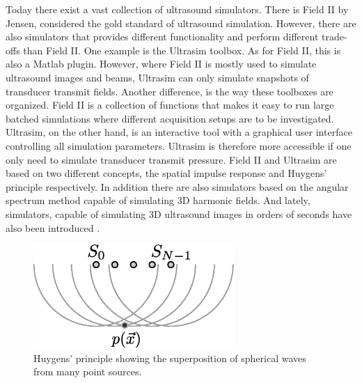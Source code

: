 Today there exist a vast collection of ultrasound simulators. There is Field II by Jensen\cite{Jensen1992}, considered the gold standard of ultrasound simulation. However, there are also simulators that provides different functionality and perform different trade-offs than Field II. One example is the Ultrasim toolbox\cite{Holm2001}. As for Field II, this is also a Matlab plugin. However, where Field II is mostly used to simulate ultrasound images and beams, Ultrasim can only simulate snapshots of transducer transmit fields. Another difference, is the way these toolboxes are organized. Field II is a collection of functions that makes it easy to run large batched simulations where different acquisition setups are to be investigated. Ultrasim, on the other hand, is an interactive tool with a graphical user interface controlling all simulation parameters. Ultrasim is therefore more accessible if one only need to simulate transducer transmit pressure. Field II and Ultrasim are based on two different concepts, the spatial impulse response and Huygens' principle respectively. In addition there are also simulators based on the angular spectrum method \cite{Prieur2012} capable of simulating 3D harmonic fields. And lately, simulators, capable of simulating 3D ultrasound images in orders of seconds have also been introduced \cite{Hergum2009}.

\begin{figure}[!t]
\centering
\includegraphics[width=3in]{img/huygens_principle.eps}
\caption{Huygens' principle showing the superposition of spherical waves from many point sources.}
\label{fig:huygens_principle}
\end{figure}

